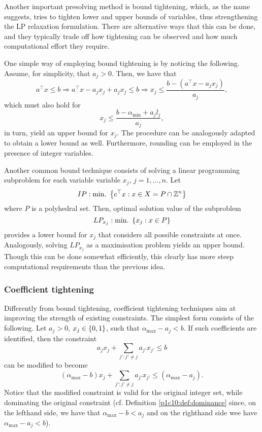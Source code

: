 Another important presolving method is bound tightening, which, as the name suggests, tries to tighten lower and upper bounds of variables, thus strengthening the LP relaxation formulation. There are alternative ways that this can be done, and they typically trade off how tightening can be observed and how much computational effort they require. 

One simple way of employing bound tightening is by noticing the following. Assume, for simplicity, that $a_j > 0$. Then, we have that
%
\begin{equation*}
	a^\top x \leq b \Rightarrow 
	a^\top x - a_jx_j + a_jx_j \leq b \Rightarrow
	x_j \leq \frac{b - (a^\top x - a_jx_j)}{a_j},	
\end{equation*}
%
which must also hold for 
%
\begin{equation*}
	x_j \leq \frac{b - \alpha_{\text{min}} + a_jl_j}{a_j},
\end{equation*}
%
in turn, yield an upper bound for $x_j$. The procedure can be analogously adapted to obtain a lower bound as well. Furthermore, rounding can be employed in the presence of integer variables. 

Another common bound technique consists of solving a linear programming subproblem for each variable variable $x_j$, $j =1, \dots, n$. Let
%
\begin{equation*}
	IP : \mathop{\text{min.~}} \left\{ c^\top x : x \in X = P \cap \mathbb{Z}^n \right \}		
\end{equation*}
%
where $P$ is a polyhedral set. Then, optimal solution value of the subproblem
%
\begin{equation*}
	LP_{x_j} : \mathop{\text{min.~}} \left\{ x_j : x \in P \right \}		
\end{equation*}
%
provides a lower bound for $x_j$ that considers all possible constraints at once. Analogously, solving $LP_{x_j}$ as a maximisation problem yields an upper bound. Though this can be done somewhat efficiently, this clearly has more steep computational requirements than the previous idea. 

\subsubsection{Coefficient tightening}

Differently from bound tightening, coefficient tightening techniques aim at improving the strength of existing constraints. The simplest form consists of the following. Let $a_j > 0$, $x_j \in \left\{ 0,1 \right \}$, such that $\alpha_{\text{max}} - a_j < b$. If such coefficients are identified, then the constraint 
%
\begin{equation*}
	a_jx_j + \sum_{j' : j' \neq j} a_{j'}x_{j'}\leq b
\end{equation*}
%
can be modified to become
%
\begin{equation*}
	(\alpha_{\text{max}} - b)x_j + \sum_{j' : j' \neq j} a_{j'}x_{j'} \leq (\alpha_{\text{max}} - a_j).
\end{equation*}
%
Notice that the modified constraint is valid for the original integer set, while dominating the original constraint (cf. Definition \ref{p1c10:def:dominance} since, on the lefthand side, we have that $\alpha_{\text{max}} - b < a_j$ and on the righthand side wee have $\alpha_{\text{max}} - a_j < b$).


